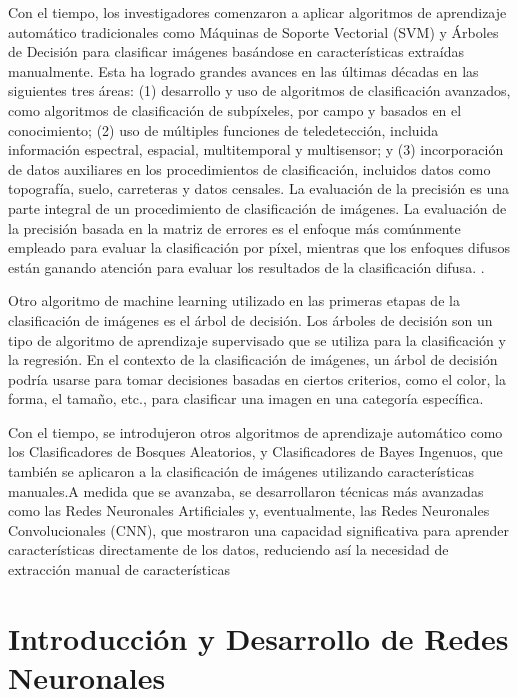 Con el tiempo, los investigadores comenzaron a aplicar algoritmos de aprendizaje automático tradicionales como Máquinas de Soporte Vectorial (SVM) y 
Árboles de Decisión para clasificar imágenes  
basándose en características extraídas manualmente. Esta ha logrado grandes avances en las últimas décadas en las siguientes tres áreas: (1) desarrollo y uso de algoritmos de clasificación avanzados, como algoritmos de clasificación de subpíxeles, por campo y basados en el conocimiento; (2) uso de múltiples funciones de teledetección, incluida información espectral, espacial, multitemporal y multisensor; y (3) incorporación de datos auxiliares en los procedimientos de clasificación, incluidos datos como topografía, suelo, carreteras y datos censales. La evaluación de la precisión es una parte integral de un procedimiento de clasificación de imágenes. La evaluación de la precisión basada en la matriz de errores es el enfoque más comúnmente empleado para evaluar la clasificación por píxel, mientras que los enfoques difusos están ganando atención para evaluar los resultados de la clasificación difusa. .

Otro algoritmo de machine learning utilizado en las primeras etapas de la clasificación de imágenes es el árbol de decisión. Los árboles de decisión son un tipo de algoritmo de aprendizaje supervisado que se utiliza para la clasificación y la regresión. En el contexto de la clasificación de imágenes, un árbol de decisión podría usarse para tomar decisiones basadas en ciertos criterios, como el color, la forma, el tamaño, etc., para clasificar una imagen en una categoría específica.

Con el tiempo, se introdujeron otros algoritmos de aprendizaje automático como los Clasificadores de Bosques Aleatorios, y Clasificadores de Bayes Ingenuos, que 
también se aplicaron a la clasificación de imágenes utilizando características manuales.A medida que se avanzaba, se desarrollaron técnicas más avanzadas como las Redes Neuronales Artificiales y, eventualmente, las Redes Neuronales Convolucionales (CNN), que mostraron una capacidad significativa para aprender características directamente de los datos, reduciendo así la necesidad de extracción manual de características 

\section{Introducción y Desarrollo de Redes Neuronales}

